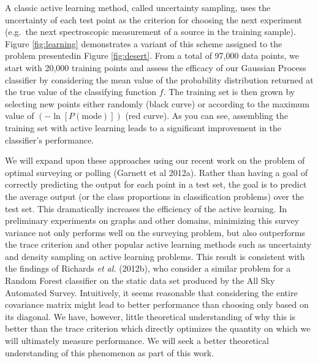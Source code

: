 \documentclass[useAMS,usenatbib,tightenlines,11pt,preprint]{aastex}
\begin{document}
A classic active learning method, called uncertainty sampling, uses
the uncertainty of each test point as the criterion for choosing the
next experiment (e.g.\ the next spectroscopic measurement of a source
in the training sample).  
Figure \ref{fig:learning} demonstrates a variant of this scheme assigned to the
problem presentedin Figure \ref{fig:desert}. From a total of 97,000 data points,
we start with 20,000 training points and assess the efficacy of our Gaussian
Process classifier by considering the mean value of the probability distribution
returned at the true value of the classifying function $f$.  The training set is
then grown by selecting new points either randomly (black curve) or according to
the maximum value of $\left(-\ln[P(\text{mode})]\right)$ (red curve).  As you can see,
assembling the training set with active learning leads to a significant
improvement in the classifier's performance.

We will expand upon these approaches using
our recent work on the problem of optimal surveying or polling
(Garnett et al 2012a).  Rather than having a goal of correctly
predicting the output for each point in a test set, the goal is to
predict the average output (or the class proportions in classification
problems) over the test set.  This dramatically increases the
efficiency of the active learning.  In preliminary experiments on
graphs and other domains, minimizing this survey variance not only
performs well on the surveying problem, but also outperforms the trace
criterion and other popular active learning methods such as
uncertainty and density sampling on active learning problems.
This result is consistent with the findings of Richards {\it et al.} (2012b),
who consider a similar problem for a Random Forest classifier on 
the static data set produced by the All Sky Automated Survey.
Intuitively, it seems reasonable that considering the entire
covariance matrix might lead to better performance than choosing only
based on its diagonal.  We have, however, little theoretical understanding of
why this is better than the trace criterion which directly optimizes
the quantity on which we will ultimately measure performance.  We will
seek a better theoretical understanding of this phenomenon as part of
this work.
\end{document}
